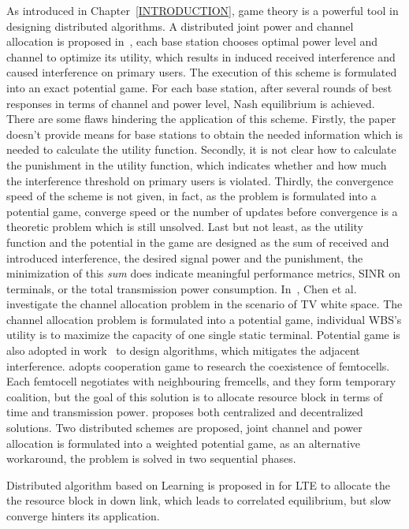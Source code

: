 As introduced in Chapter~\ref{INTRODUCTION}, game theory is a powerful tool in designing distributed algorithms.
A distributed joint power and channel allocation is proposed in~\cite{pimrc_2012}, each base station chooses optimal power level and channel to optimize its utility, which results in induced received interference and caused interference on primary users. 
The execution of this scheme is formulated into an exact potential game. 
For each base station, after several rounds of best responses in terms of channel and power level, Nash equilibrium is achieved.
There are some flaws hindering the application of this scheme.
Firstly, the paper doesn't provide means for base stations to obtain the needed information which is needed to calculate the utility function.
Secondly, it is not clear how to calculate the punishment in the utility function, which indicates whether and how much the interference threshold on primary users is violated.
Thirdly, the convergence speed of the scheme is not given, in fact, as the problem is formulated into a potential game, converge speed or the number of updates before convergence is a theoretic problem which is still unsolved.
Last but not least, as the utility function and the potential in the game are designed as the sum of received and introduced interference, the desired signal power and the punishment, the minimization of this \textit{sum} does indicate meaningful  performance metrics, \ie SINR on terminals, or the total transmission power consumption.
In~\cite{spectrum_sharing_tvspace_2012}, Chen et al. investigate the channel allocation problem in the scenario of TV white space.
The channel allocation problem is formulated into a potential game, individual WBS's utility is to maximize the capacity of one single static terminal.
%
Potential game is also adopted in work~\cite{tvws_paper_networking2015} to design algorithms, which mitigates the adjacent interference.
%
\cite{powerChannelAllocation_2015_shapley} adopts cooperation game to research the coexistence of femtocells.
Each femtocell negotiates with neighbouring fremcells, and they form temporary coalition, but the goal of this solution is to allocate resource block in terms of time and transmission power.
\cite{joint_power_channel_linkpair_08ICT} proposes both centralized and decentralized solutions.
Two distributed schemes are proposed, joint channel and power allocation is formulated into a weighted potential game, as an alternative workaround, the problem is solved in two sequential phases.

%
Distributed algorithm based on Learning is proposed in \cite{cogCE_huang} for LTE to allocate the the resource block in down link, which leads to correlated equilibrium, but slow converge hinters its application.
%



